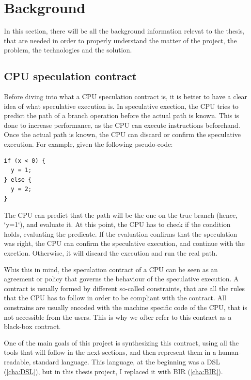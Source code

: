 \chapter{Background}
\label{cha:background}

In this section, there will be all the background information relevat to the thesis,
that are needed in order to properly understand the matter of the project, the problem,
the technologies and the solution.

\section{CPU speculation contract}
\label{cha:CPU speculation contract} Before diving into what a CPU speculation
contract is, it is better to have a clear idea of what speculative execution is.
In speculative exection, the CPU tries to predict the path of a branch operation
before the actual path is known. This is done to increase performance, as the CPU
can execute instructions beforehand. Once the actual path is known, the CPU can discard
or confirm the speculative execution. For example, given the following pseudo-code:
\begin{verbatim}
if (x < 0) {
  y = 1;
} else {
  y = 2;
}
\end{verbatim} The CPU can
predict that the path will be the one on the true branch (hence, `y=1`), and
evaluate it. At this point, the CPU has to check if the condition holds, evaluating
the predicate. If the evaluation confirms that the speculation was right, the CPU
can confirm the speculative execution, and continue with the exection. Otherwise,
it will discard the execution and run the real path.

Whis this in mind, the speculation contract of a CPU can be seen as an agreement
or policy that governs the behaviour of the speculative execution. A contract is
usually formed by different so-called constraints, that are all the rules that the
CPU has to follow in order to be compliant with the contract. All constrains are
usually encoded with the machine specific code of the CPU, that is not accessible
from the users. This is why we ofter refer to this contract as a black-box
contract.

One of the main goals of this project is synthesizing this contract, using all the
tools that will follow in the next sections, and then represent them in a human-readable,
standard language. This language, at the beginning was a DSL (\ref*{cha:DSL}),
but in this thesis project, I replaced it with BIR (\ref*{cha:BIR}).

